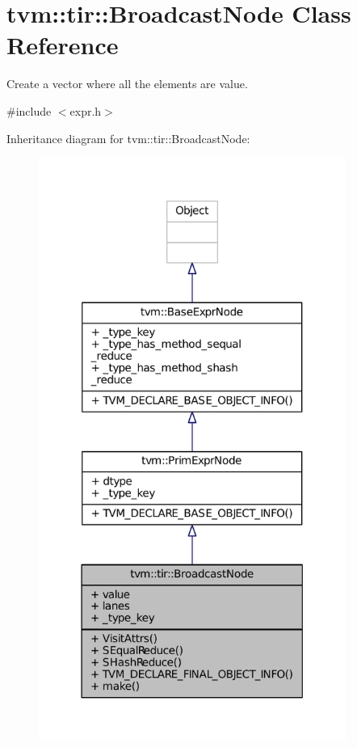 \hypertarget{classtvm_1_1tir_1_1BroadcastNode}{}\section{tvm\+:\+:tir\+:\+:Broadcast\+Node Class Reference}
\label{classtvm_1_1tir_1_1BroadcastNode}


Create a vector where all the elements are value.  




{\ttfamily \#include $<$expr.\+h$>$}



Inheritance diagram for tvm\+:\+:tir\+:\+:Broadcast\+Node\+:
\nopagebreak
\begin{figure}[H]
\begin{center}
\leavevmode
\includegraphics[width=285pt]{classtvm_1_1tir_1_1BroadcastNode__inherit__graph}
\end{center}
\end{figure}


